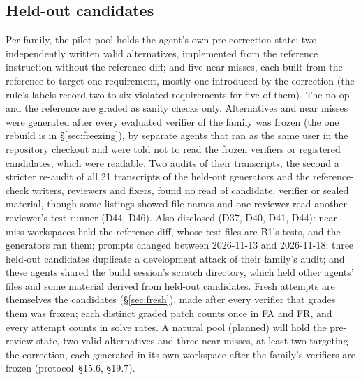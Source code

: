 \subsection{Held-out candidates}
\label{sec:pools}
Per family, the pilot pool holds the agent's own pre-correction state; two independently written valid alternatives, implemented from the reference instruction without the reference diff; and five near misses, each built from the reference to target one requirement, mostly one introduced by the correction (the rule's labels record two to six violated requirements for five of them). The no-op and the reference are graded as sanity checks only. Alternatives and near misses were generated after every evaluated verifier of the family was frozen (the one rebuild is in \S\ref{sec:freezing}), by separate agents that ran as the same user in the repository checkout and were told not to read the frozen verifiers or registered candidates, which were readable. Two audits of their transcripts, the second a stricter re-audit of all 21 transcripts of the held-out generators and the reference-check writers, reviewers and fixers, found no read of candidate, verifier or sealed material, though some listings showed file names and one reviewer read another reviewer's test runner (D44, D46). Also disclosed (D37, D40, D41, D44): near-miss workspaces held the reference diff, whose test files are B1's tests, and the generators ran them; prompts changed between 2026-11-13 and 2026-11-18; three held-out candidates duplicate a development attack of their family's audit; and these agents shared the build session's scratch directory, which held other agents' files and some material derived from held-out candidates. Fresh attempts are themselves the candidates (\S\ref{sec:fresh}), made after every verifier that grades them was frozen; each distinct graded patch counts once in FA and FR, and every attempt counts in solve rates. A natural pool (planned) will hold the pre-review state, two valid alternatives and three near misses, at least two targeting the correction, each generated in its own workspace after the family's verifiers are frozen (protocol~\S15.6, \S19.7).

